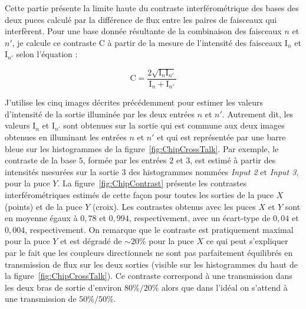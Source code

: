 
Cette partie présente la limite haute du contraste interférométrique des bases des deux puces calculé par la différence de flux entre les paires de faisceaux qui interfèrent. Pour une base donnée résultante de la combinaison des faisceaux $n$ et $n'$, je calcule ce contraste C à partir de la mesure de l'intensité des faisceaux $\text{I}_{n}$ et $\text{I}_{n'}$ selon l'équation :

\begin{equation}
    \text{C} = \frac{2 \sqrt{\text{I}_{n} \text{I}_{n'}}}{\text{I}_{n} + \text{I}_{n'}}
\end{equation}

J'utilise les cinq images décrites précédemment pour estimer les valeurs d'intensité de la sortie illuminée par les deux entrées $n$ et $n'$. Autrement dit, les valeurs $\text{I}_{n}$ et $\text{I}_{n'}$ sont obtenues sur la sortie qui est commune aux deux images obtenues en illuminant les entrées $n$ et $n'$ et qui est représentée par une barre bleue sur les histogrammes de la figure~\ref{fig:ChipCrossTalk}. Par exemple, le contraste de la base $5$, formée par les entrées $2$ et $3$, est estimé à partir des intensités mesurées sur la sortie $3$ des histogrammes nommées \textit{Input 2} et \textit{Input 3}, pour la puce $Y$. La figure~\ref{fig:ChipContrast} présente les contrastes interférométriques estimés de cette façon pour toutes les sorties de la puce $X$ (points) et de la puce $Y$ (croix). Les contrastes obtenus avec les puces $X$ et $Y$ sont en moyenne égaux à $0,78$ et $0,994$, respectivement, avec un écart-type de $0,04$ et $0,004$, respectivement. On remarque que le contraste est pratiquement maximal pour la puce $Y$ et est dégradé de $\sim 20\%$ pour la puce $X$ ce qui peut s'expliquer par le fait que les coupleurs directionnels ne sont pas parfaitement équilibrés en transmission de flux sur les deux sorties (visible sur les histogrammes du haut de la figure~\ref{fig:ChipCrossTalk}). Ce contraste correspond à une transmission dans les deux bras de sortie d'environ $80\% / 20\%$ alors que dans l'idéal on s'attend à une transmission de $50\% / 50\%$.

